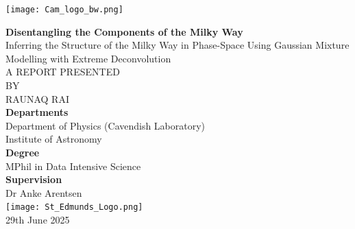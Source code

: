 \documentclass[a4paper,12pt]{article}
\begin{document}
\begin{titlepage}
    \centering
    \texttt{[image: Cam\_logo\_bw.png]}\\[1.5cm]


    \vspace{1cm}

    {\LARGE \bfseries Disentangling the Components of the Milky Way}\\[0.75cm]
    {\large \textsc Inferring the Structure of the Milky Way in Phase-Space Using Gaussian Mixture Modelling with Extreme Deconvolution}\\[1.5cm]

    \vspace{0.5cm}
    \large
    \textsc{A REPORT PRESENTED}\\[0.3cm]
    \textsc{BY}\\[0.3cm]
    \textsc{RAUNAQ RAI}\\[1cm]

    \normalsize
    \textbf{Departments}\\[0.3cm]
    Department of Physics (Cavendish Laboratory)\\
    Institute of Astronomy\\[1cm]

    \textbf{Degree}\\[0.3cm]
    MPhil in Data Intensive Science\\[1cm]

    \textbf{Supervision}\\[0.3cm]
    Dr Anke Arentsen\\

    \vfill
    \texttt{[image: St\_Edmunds\_Logo.png]}\\[0.25cm]
    29th June 2025

\end{titlepage}
\end{document}

